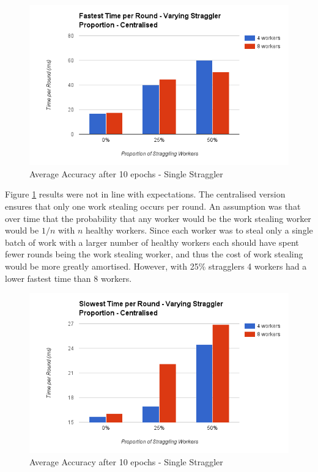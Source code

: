 \documentclass[12pt]{article}
\begin{document}
\begin{figure}[H]
  \centering
  \includegraphics[width=6in]{FastestStragglerCentralised}
  \caption[]{Average Accuracy after 10 epochs - Single Straggler}
  \label{FastestStragglerCentralised}
\end{figure}

Figure \ref{FastestStragglerCentralised} results were not in line with expectations. The centralised version ensures that only one work stealing occurs per round. An assumption was that over time that the probability that any worker would be the work stealing worker would be $1/n$ with $n$ healthy workers. Since each worker was to steal only a single batch of work with a larger number of healthy workers each should have spent fewer rounds being the work stealing worker, and thus the cost of work stealing would be more greatly amortised. However, with 25\% stragglers 4 workers had a lower fastest time than 8 workers.

\begin{figure}[H]
  \centering
  \includegraphics[width=6in]{SlowestStragglerCentralised}
  \caption[]{Average Accuracy after 10 epochs - Single Straggler}
  \label{SlowestStragglerCentralised}
\end{figure}
\end{document}
